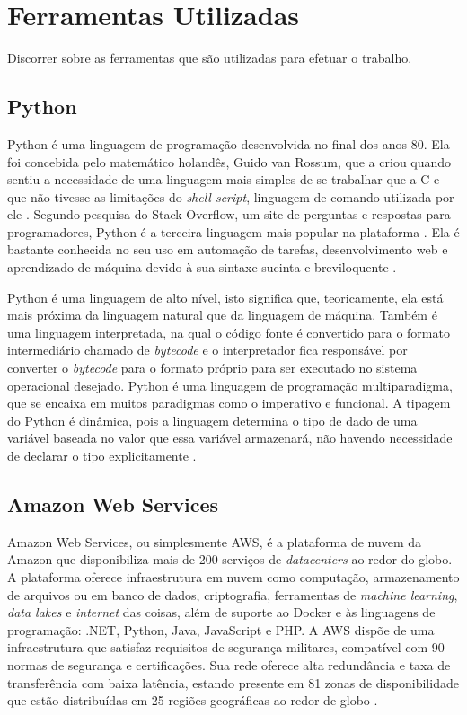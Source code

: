 \section{Ferramentas Utilizadas}
\label{sec:ferramentas}
Discorrer sobre as ferramentas que são utilizadas para efetuar o trabalho.

\subsection{Python}
\label{subsec:python}
Python é uma linguagem de programação desenvolvida no final dos anos 80. Ela foi concebida pelo matemático holandês, Guido van Rossum, que a criou quando sentiu a necessidade de uma linguagem mais simples de se trabalhar que a C e que não tivesse as limitações do \textit{shell script}, linguagem de comando utilizada por ele \cite{de2020python}. Segundo pesquisa do Stack Overflow, um site de perguntas e respostas para programadores, Python é a terceira linguagem mais popular na plataforma \cite{stackoverflow:survey}. Ela é bastante conhecida no seu uso em automação de tarefas, desenvolvimento web e aprendizado de máquina devido à sua sintaxe sucinta e breviloquente \cite{de2020python}.

Python é uma linguagem de alto nível, isto significa que, teoricamente, ela está mais próxima da linguagem natural que da linguagem de máquina. Também é uma linguagem interpretada, na qual o código fonte é convertido para o formato intermediário chamado de \textit{bytecode} e o interpretador fica responsável por converter o \textit{bytecode} para o formato próprio para ser executado no sistema operacional desejado. Python é uma linguagem de programação multiparadigma, que se encaixa em muitos paradigmas como o imperativo e funcional. A tipagem do Python é dinâmica, pois a linguagem determina o tipo de dado de uma variável baseada no valor que essa variável armazenará, não havendo necessidade de declarar o tipo explicitamente \cite{de2020python}.


\subsection{Amazon Web Services}
\label{subsec:aws}


Amazon Web Services, ou simplesmente AWS, é a plataforma de nuvem da Amazon que disponibiliza mais de 200 serviços de \textit{datacenters} ao redor do globo. A plataforma oferece infraestrutura em nuvem como computação, armazenamento de arquivos ou em banco de dados, criptografia, ferramentas de \textit{machine learning}, \textit{data lakes} e \textit{internet} das coisas, além de suporte ao Docker e às linguagens de programação: .NET, Python, Java, JavaScript e PHP. A AWS dispõe de uma infraestrutura que satisfaz requisitos de segurança militares, compatível com 90 normas de segurança e certificações. Sua rede oferece alta redundância e taxa de transferência com baixa latência, estando presente em 81 zonas de disponibilidade que estão distribuídas em 25 regiões geográficas ao redor de globo \cite{aws:about}.

